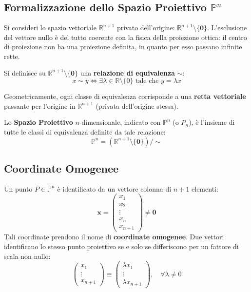 \subsection{Formalizzazione dello Spazio Proiettivo $\mathbb{P}^n$}
Si consideri lo spazio vettoriale $\mathbb{R}^{n+1}$ privato dell'origine: $\mathbb{R}^{n+1} \setminus \{\mathbf{0}\}$. L'esclusione del vettore nullo è del tutto coerente con la fisica della proiezione ottica: il centro di proiezione non ha una proiezione definita, in quanto per esso passano infinite rette.

Si definisce su $\mathbb{R}^{n+1} \setminus \{\mathbf{0}\}$ una \textbf{relazione di equivalenza} $\sim$:
\begin{equation}
    x \sim y \iff \exists \lambda \in \mathbb{R} \setminus \{0\} \text{ tale che } y = \lambda x
\end{equation}

Geometricamente, ogni classe di equivalenza corrisponde a una \textbf{retta vettoriale} passante per l'origine in $\mathbb{R}^{n+1}$ (privata dell'origine stessa).

Lo \textbf{Spazio Proiettivo} $n$-dimensionale, indicato con $\mathbb{P}^n$ (o $P_n$), è l'insieme di tutte le classi di equivalenza definite da tale relazione:
\begin{equation}
    \mathbb{P}^n = (\mathbb{R}^{n+1} \setminus \{\mathbf{0}\}) / \sim
\end{equation}

\subsection{Coordinate Omogenee}
Un punto $P \in \mathbb{P}^n$ è identificato da un vettore colonna di $n+1$ elementi:
\begin{equation}
    \mathbf{x} = \begin{pmatrix} x_1 \\ x_2 \\ \vdots \\ x_n \\ x_{n+1} \end{pmatrix} \neq \mathbf{0}
\end{equation}
Tali coordinate prendono il nome di \textbf{coordinate omogenee}. Due vettori identificano lo stesso punto proiettivo se e solo se differiscono per un fattore di scala non nullo:
\begin{equation}
    \begin{pmatrix} x_1 \\ \vdots \\ x_{n+1} \end{pmatrix} \equiv \begin{pmatrix} \lambda x_1 \\ \vdots \\ \lambda x_{n+1} \end{pmatrix}, \quad \forall \lambda \neq 0
\end{equation}


